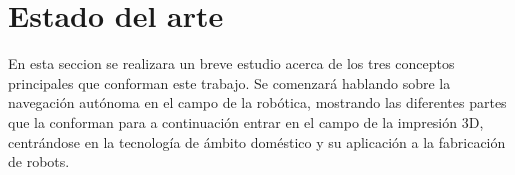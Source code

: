 \chapter{Estado del arte}
\label{estado del arte}

En esta seccion se realizara un breve estudio acerca de los tres conceptos principales que conforman este trabajo. Se comenzará hablando sobre la navegación autónoma en el campo de la robótica, mostrando las diferentes partes que la conforman para a continuación entrar en el campo de la impresión 3D, centrándose en la tecnología de ámbito doméstico y su aplicación a la fabricación de robots.



